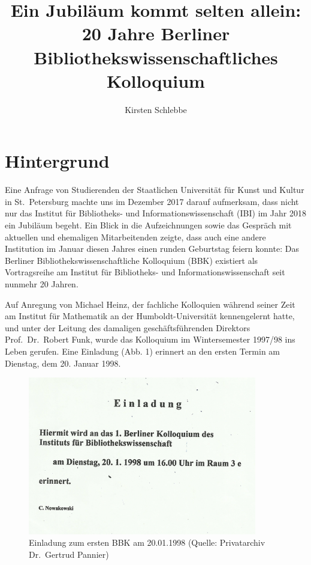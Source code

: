 \documentclass[a4paper,
fontsize=11pt,
oneside,
numbers=noperiodatend,
parskip=half-,
bibliography=totoc,
final
]{scrartcl}
\title{\LARGE{Ein Jubiläum kommt selten allein: 20 Jahre Berliner Bibliothekswissenschaftliches Kolloquium}}%
\author{Kirsten Schlebbe} %
\date{}
\begin{document}
\maketitle
\thispagestyle{fancyplain} 


\hypertarget{hintergrund}{%
\section{Hintergrund}\label{hintergrund}}

Eine Anfrage von Studierenden der Staatlichen Universität für Kunst und
Kultur in St.~Petersburg machte uns im Dezember 2017 darauf aufmerksam,
dass nicht nur das Institut für Bibliotheks- und
Informationswissenschaft (IBI) im Jahr 2018 ein Jubiläum begeht. Ein
Blick in die Aufzeichnungen sowie das Gespräch mit aktuellen und
ehemaligen Mitarbeitenden zeigte, dass auch eine andere Institution im
Januar diesen Jahres einen runden Geburtstag feiern konnte: Das Berliner
Bibliothekswissenschaftliche Kolloquium (BBK) existiert als
Vortragsreihe am Institut für Bibliotheks- und Informationswissenschaft
seit nunmehr 20 Jahren.

Auf Anregung von Michael Heinz, der fachliche Kolloquien während seiner
Zeit am Institut für Mathematik an der Humboldt-Universität
kennengelernt hatte, und unter der Leitung des damaligen
geschäftsführenden Direktors Prof.~Dr.~Robert Funk, wurde das Kolloquium
im Wintersemester 1997/98 ins Leben gerufen. Eine Einladung (Abb. 1)
erinnert an den ersten Termin am Dienstag, dem 20. Januar 1998.

\begin{figure}
\centering
\includegraphics[width=10cm]{img/Abbildung1.png}
\caption{Einladung zum ersten BBK am 20.01.1998 (Quelle: Privatarchiv
Dr.~Gertrud Pannier)}
\end{figure}
\end{document}
